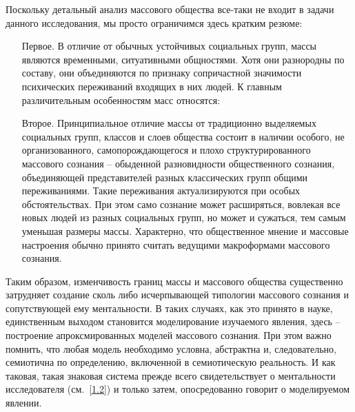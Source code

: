 Поскольку детальный анализ массового общества все-таки не входит в задачи данного исследования,
мы просто ограничимся здесь кратким резюме:
\begin{itemize}
\item[Первое.] В отличие от обычных устойчивых социальных групп, массы являются временными,
  ситуативными общностями. Хотя они разнородны по составу, они объединяются по признаку сопричастной
  значимости психических переживаний входящих в них людей. К главным различительным особенностям масс
  относятся:
\item[Второе.] Принципиальное отличие массы от традиционно выделяемых социальных групп,
  классов и слоев общества состоит в наличии особого, не организованного, самопорождающегося и
  плохо структурированного массового сознания -- обыденной разновидности общественного сознания,
  объединяющей представителей разных классических групп общими переживаниями. Такие переживания
  актуализируются при особых обстоятельствах. При этом само сознание может расширяться, вовлекая
  все новых людей из разных социальных групп, но может и сужаться, тем самым уменьшая размеры массы.
  Характерно, что общественное мнение и массовые настроения обычно принято считать ведущими макроформами
  массового сознания.
\end{itemize}
Таким образом, изменчивость границ массы и массового общества существенно затрудняет создание сколь
либо исчерпывающей типологии массового сознания и сопутствующей ему ментальности. В таких случаях,
как это принято в науке, единственным выходом становится моделирование изучаемого явления, здесь --
построение апроксмированных моделей массового сознания. При этом важно помнить, что любая модель
необходимо условна, абстрактна и, следовательно, семиотична по определению, включенной в семиотическую реальность.
И как таковая, такая знаковая система прежде всего свидетельствует о ментальности исследователя (см.~\ref{1.2}) и
только затем, опосредованно говорит о моделируемом явлении.
